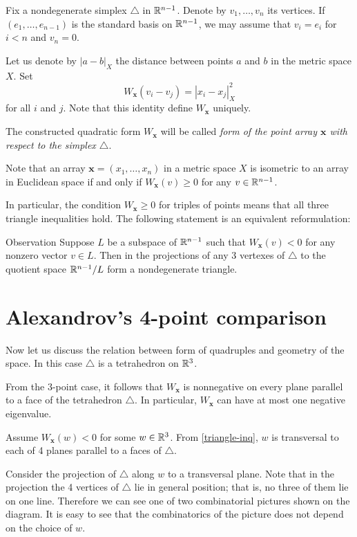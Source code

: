 \documentclass{article}
\begin{document}
Fix a nondegenerate simplex $\triangle$ in $\mathbb{R}^{n-1}$.
Denote by $v_1,\dots,v_n$ its vertices.
If $(e_1,\dots,e_{n-1})$ is the standard basis on $\mathbb{R}^{n-1}$,
we may assume that $v_i=e_i$ for $i<n$ and $v_n=0$.

Let us denote by $|a-b|_X$ the distance between points $a$ and $b$ in the metric space $X$.
Set
\[W_{\bm{x}}(v_i-v_j)=|x_i-x_j|^2_X\] 
for all $i$ and $j$.
Note that this identity define $W_{\bm{x}}$ uniquely.


The constructed quadratic form $W_{\bm{x}}$ will be called \emph{form of the point array $\bm{x}$ with respect to the simplex $\triangle$}.

Note that an array $\bm{x}=(x_1,\dots,x_n)$ in a metric space $X$ is isometric to an array in Euclidean space if and only if 
$W_{\bm{x}}(v)\ge 0$
for any $v\in \mathbb{R}^{n-1}$.

In particular,  the
condition $W_{\bm{x}}\ge 0$ for triples of points means that 
all three triangle inequalities hold.
The following statement is an equivalent reformulation:

\begin{thm}{Observation}\label{triangle-inq}
Suppose $L$ be a subspace of $\mathbb{R}^{n-1}$ such that
$W_{\bm{x}}(v)< 0$ for any nonzero vector $v\in L$.
Then in the projections of any 3 vertexes of $\triangle$ to the quotient space $\mathbb{R}^{n-1}/L$ form a nondegenerate triangle.
\end{thm}

\section{Alexandrov's 4-point comparison}

Now let us discuss the relation between form of quadruples
and geometry of the space.
In this case $\triangle$ is a tetrahedron on $\mathbb{R}^3$.

From the $3$-point case, 
it follows that $W_{\bm{x}}$ 
is nonnegative on every plane parallel to a face of the tetrahedron $\triangle$.
In particular, $W_{\bm{x}}$ can have at most one negative eigenvalue.

Assume $W_{\bm{x}}(w)<0$ for some $w\in\mathbb{R}^3$.
From \ref{triangle-inq},
$w$ is transversal to each of 4 planes parallel to a faces of $\triangle$.

Consider the projection of $\triangle$ along $w$ to a transversal plane. 
Note that in the projection the 4 vertices of $\triangle$ lie in general position; 
that is, no three of them lie on one line.
Therefore  we can see one of two combinatorial pictures shown on the diagram.
It is easy to see that the combinatorics of the picture does not depend on the choice of $w$.
\end{document}
